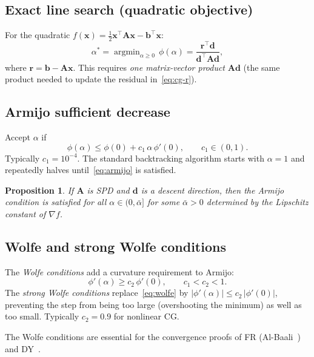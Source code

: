 \documentclass[11pt,a4paper]{article}
\newtheorem{proposition}[theorem]{Proposition}
\newcommand{\bA}{\mathbf{A}}
\newcommand{\bb}{\mathbf{b}}
\newcommand{\br}{\mathbf{r}}
\newcommand{\bd}{\mathbf{d}}
\newcommand{\bx}{\mathbf{x}}
\newcommand{\tr}{\top}
\begin{document}
\subsection{Exact line search (quadratic objective)}

For the quadratic $f(\bx) = \tfrac{1}{2}\bx^\tr\bA\bx - \bb^\tr\bx$:
\begin{equation}
  \alpha^* = \operatorname{argmin}_{\alpha \geq 0}\,\phi(\alpha)
           = \frac{\br^\tr \bd}{\bd^\tr \bA \bd},
  \label{eq:exact-ls}
\end{equation}
where $\br = \bb - \bA\bx$.  This requires \emph{one matrix-vector product}
$\bA\bd$ (the same product needed to update the residual in~\eqref{eq:cg-r}).

\subsection{Armijo sufficient decrease}

Accept $\alpha$ if
\begin{equation}
  \phi(\alpha) \leq \phi(0) + c_1\,\alpha\,\phi'(0), \qquad c_1 \in (0,1).
  \label{eq:armijo}
\end{equation}
Typically $c_1 = 10^{-4}$.  The standard backtracking algorithm starts with
$\alpha = 1$ and repeatedly halves until~\eqref{eq:armijo} is satisfied.

\begin{proposition}
  If $\bA$ is SPD and $\bd$ is a descent direction, then the Armijo condition
  is satisfied for all $\alpha \in (0, \bar\alpha]$ for some $\bar\alpha > 0$
  determined by the Lipschitz constant of $\nabla f$.
\end{proposition}

\subsection{Wolfe and strong Wolfe conditions}

The \emph{Wolfe conditions} add a curvature requirement to Armijo:
\begin{equation}
  \phi'(\alpha) \geq c_2\,\phi'(0), \qquad c_1 < c_2 < 1.
  \label{eq:wolfe}
\end{equation}
The \emph{strong Wolfe conditions} replace~\eqref{eq:wolfe} by
$|\phi'(\alpha)| \leq c_2\,|\phi'(0)|$, preventing the step from being too
large (overshooting the minimum) as well as too small.  Typically $c_2 = 0.9$
for nonlinear CG.

The Wolfe conditions are essential for the convergence proofs of FR
(Al-Baali~\cite{AlBaali1985}) and DY~\cite{DaiYuan1999}.
\end{document}
